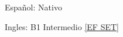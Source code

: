 

\begin{cvhonors}

  \cvhonor
    {Español: Nativo}

  \cvhonor
    {Ingles: B1 Intermedio \href{https://links.t-educationfirst.mkt4686.com/servlet/MailView?ms=NTY0Mzg4NzcS1&r=LTgzODk5MTE0NzkS1&j=MjI1NjA1NTI4NQS2&mt=1&rt=0}{[EF SET]}}

\end{cvhonors}